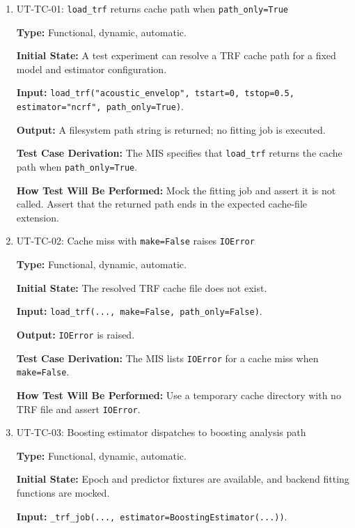 \documentclass[12pt, titlepage]{article}
\begin{document}
\begin{enumerate}

\item{UT-TC-01: \texttt{load\_trf} returns cache path when \texttt{path\_only=True}\\}

\textbf{Type:} Functional, dynamic, automatic.

\textbf{Initial State:} A test experiment can resolve a TRF cache path for a fixed model and estimator configuration.

\textbf{Input:} \texttt{load\_trf("acoustic\_envelop", tstart=0, tstop=0.5, estimator="ncrf", path\_only=True)}.

\textbf{Output:} A filesystem path string is returned; no fitting job is executed.

\textbf{Test Case Derivation:} The MIS specifies that \texttt{load\_trf} returns the cache path when \texttt{path\_only=True}.

\textbf{How Test Will Be Performed:} Mock the fitting job and assert it is not called. Assert that the returned path ends in the expected cache-file extension.

\item{UT-TC-02: Cache miss with \texttt{make=False} raises \texttt{IOError}\\}

\textbf{Type:} Functional, dynamic, automatic.

\textbf{Initial State:} The resolved TRF cache file does not exist.

\textbf{Input:} \texttt{load\_trf(..., make=False, path\_only=False)}.

\textbf{Output:} \texttt{IOError} is raised.

\textbf{Test Case Derivation:} The MIS lists \texttt{IOError} for a cache miss when \texttt{make=False}.

\textbf{How Test Will Be Performed:} Use a temporary cache directory with no TRF file and assert \texttt{IOError}.

\item{UT-TC-03: Boosting estimator dispatches to boosting analysis path\\}

\textbf{Type:} Functional, dynamic, automatic.

\textbf{Initial State:} Epoch and predictor fixtures are available, and backend fitting functions are mocked.

\textbf{Input:} \texttt{\_trf\_job(..., estimator=BoostingEstimator(...))}.


\end{enumerate}
\end{document}
